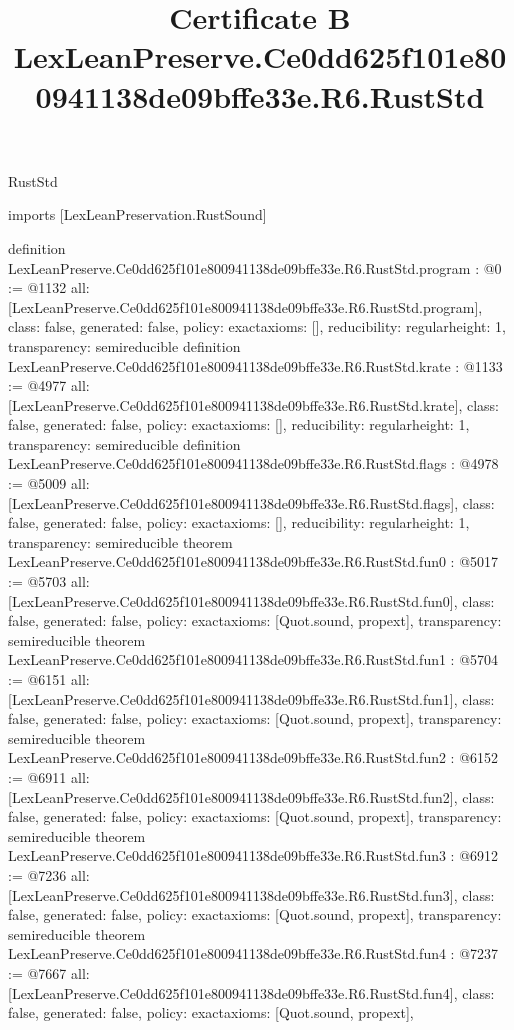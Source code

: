 \begin{lexlean}{RustStd}
\title{Certificate B LexLeanPreserve.Ce0dd625f101e800941138de09bffe33e.R6.RustStd}
\begin{coremodule}
imports [LexLeanPreservation.RustSound]

definition LexLeanPreserve.Ce0dd625f101e800941138de09bffe33e.R6.RustStd.program : @0 := @1132 {
  all: [LexLeanPreserve.Ce0dd625f101e800941138de09bffe33e.R6.RustStd.program],
  class: false,
  generated: false,
  policy: exact{axioms: []},
  reducibility: regular{height: 1},
  transparency: semireducible
}
definition LexLeanPreserve.Ce0dd625f101e800941138de09bffe33e.R6.RustStd.krate : @1133 := @4977 {
  all: [LexLeanPreserve.Ce0dd625f101e800941138de09bffe33e.R6.RustStd.krate],
  class: false,
  generated: false,
  policy: exact{axioms: []},
  reducibility: regular{height: 1},
  transparency: semireducible
}
definition LexLeanPreserve.Ce0dd625f101e800941138de09bffe33e.R6.RustStd.flags : @4978 := @5009 {
  all: [LexLeanPreserve.Ce0dd625f101e800941138de09bffe33e.R6.RustStd.flags],
  class: false,
  generated: false,
  policy: exact{axioms: []},
  reducibility: regular{height: 1},
  transparency: semireducible
}
theorem LexLeanPreserve.Ce0dd625f101e800941138de09bffe33e.R6.RustStd.fun0 : @5017 := @5703 {
  all: [LexLeanPreserve.Ce0dd625f101e800941138de09bffe33e.R6.RustStd.fun0],
  class: false,
  generated: false,
  policy: exact{axioms: [Quot.sound, propext]},
  transparency: semireducible
}
theorem LexLeanPreserve.Ce0dd625f101e800941138de09bffe33e.R6.RustStd.fun1 : @5704 := @6151 {
  all: [LexLeanPreserve.Ce0dd625f101e800941138de09bffe33e.R6.RustStd.fun1],
  class: false,
  generated: false,
  policy: exact{axioms: [Quot.sound, propext]},
  transparency: semireducible
}
theorem LexLeanPreserve.Ce0dd625f101e800941138de09bffe33e.R6.RustStd.fun2 : @6152 := @6911 {
  all: [LexLeanPreserve.Ce0dd625f101e800941138de09bffe33e.R6.RustStd.fun2],
  class: false,
  generated: false,
  policy: exact{axioms: [Quot.sound, propext]},
  transparency: semireducible
}
theorem LexLeanPreserve.Ce0dd625f101e800941138de09bffe33e.R6.RustStd.fun3 : @6912 := @7236 {
  all: [LexLeanPreserve.Ce0dd625f101e800941138de09bffe33e.R6.RustStd.fun3],
  class: false,
  generated: false,
  policy: exact{axioms: [Quot.sound, propext]},
  transparency: semireducible
}
theorem LexLeanPreserve.Ce0dd625f101e800941138de09bffe33e.R6.RustStd.fun4 : @7237 := @7667 {
  all: [LexLeanPreserve.Ce0dd625f101e800941138de09bffe33e.R6.RustStd.fun4],
  class: false,
  generated: false,
  policy: exact{axioms: [Quot.sound, propext]},
}
\end{coremodule}
\end{lexlean}
